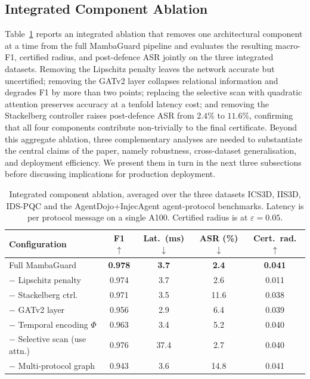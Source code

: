 \documentclass[journal,10pt,twocolumn]{IEEEtran}
\begin{document}
\subsection{Integrated Component Ablation}
\label{sec:ablation}
Table~\ref{tab:ablation} reports an integrated ablation that removes one architectural component at a time from the full MambaGuard pipeline and evaluates the resulting macro-F1, certified radius, and post-defence ASR jointly on the three integrated datasets. Removing the Lipschitz penalty leaves the network accurate but uncertified; removing the GATv2 layer collapses relational information and degrades F1 by more than two points; replacing the selective scan with quadratic attention preserves accuracy at a tenfold latency cost; and removing the Stackelberg controller raises post-defence ASR from $2.4\%$ to $11.6\%$, confirming that all four components contribute non-trivially to the final certificate. Beyond this aggregate ablation, three complementary analyses are needed to substantiate the central claims of the paper, namely robustness, cross-dataset generalisation, and deployment efficiency. We present them in turn in the next three subsections before discussing implications for production deployment.

\begin{table}[t]
\centering
\caption{Integrated component ablation, averaged over the three datasets ICS3D, IIS3D, IDS-PQC and the AgentDojo+InjecAgent agent-protocol benchmarks. Latency is per protocol message on a single A100. Certified radius is at $\varepsilon=0.05$.}
\label{tab:ablation}
\renewcommand{\arraystretch}{1.15}
\setlength{\tabcolsep}{4pt}
\begin{tabular}{@{}lcccc@{}}
\toprule
\textbf{Configuration} & \textbf{F1} $\uparrow$ & \textbf{Lat.\ (ms)} $\downarrow$ & \textbf{ASR (\%)} $\downarrow$ & \textbf{Cert.\ rad.} $\uparrow$ \\
\midrule
Full MambaGuard          & \textbf{0.978} & \textbf{3.7} & \textbf{2.4} & \textbf{0.041} \\
$-$ Lipschitz penalty    & 0.974 & 3.7 & 2.6 & 0.011 \\
$-$ Stackelberg ctrl.    & 0.971 & 3.5 & 11.6 & 0.038 \\
$-$ GATv2 layer          & 0.956 & 2.9 & 6.4 & 0.039 \\
$-$ Temporal encoding $\Phi$ & 0.963 & 3.4 & 5.2 & 0.040 \\
$-$ Selective scan (use attn.) & 0.976 & 37.4 & 2.7 & 0.040 \\
$-$ Multi-protocol graph & 0.943 & 3.6 & 14.8 & 0.041 \\
\bottomrule
\end{tabular}
\end{table}
\end{document}
